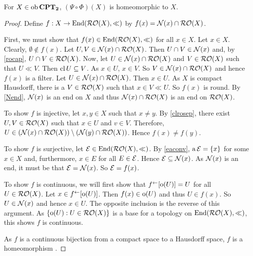 \begin{theorem}
	\label{psiphihomeom}
	For \( X \in \operatorname{ob}{\bf{CPT}_\mathbf{2}} \), \( (\Psi \circ \Phi)(X) \) is homeomorphic to \( X \).
\end{theorem}
\begin{proof}
	Define \( f:X \to \operatorname{End}(\operatorname{\mathcal{RO}}(X),\ll) \) by \( f(x) = \mathcal{N}(x) \cap \operatorname{\mathcal{RO}}(X) \).
	
	First, we must show that \( f(x) \in \operatorname{End}(\operatorname{\mathcal{RO}}(X),\ll) \) for all \( x \in X \).  Let \( x \in X \).  Clearly, \( \emptyset \not\in f(x) \).  Let \( U,V \in \mathcal{N}(x) \cap \operatorname{\mathcal{RO}}(X) \).  Then \( U \cap V \in \mathcal{N}(x) \) and, by \ref{rocap}, \( U \cap V \in \operatorname{\mathcal{RO}}(X) \).  Now, let \( U \in \mathcal{N}(x) \cap \operatorname{\mathcal{RO}}(X) \) and \( V \in \operatorname{\mathcal{RO}}(X) \) such that \( U \ll V \).  Then \( \operatorname{cl}{U} \subseteq V \).  As \( x \in U \), \( x \in V \).  So \( V \in \mathcal{N}(x) \cap \operatorname{\mathcal{RO}}(X) \) and hence \( f(x) \) is a filter.  Let \( U \in \mathcal{N}(x) \cap \operatorname{\mathcal{RO}}(X) \).  Then \( x \in U \).  As \( X \) is compact Hausdorff, there is a \( V \in \operatorname{\mathcal{RO}}(X) \) such that \( x \in V \ll U \).  So \( f(x) \) is round.  By \ref{Nend}, \( \mathcal{N}(x) \) is an end on \( X \) and thus \( \mathcal{N}(x) \cap \operatorname{\mathcal{RO}}(X) \) is an end on \( \operatorname{\mathcal{RO}}(X) \).
	
	To show \( f \) is injective, let \( x,y \in X \) such that \( x \neq y \).  By \ref{clrosep}, there exist \( U,V \in \operatorname{\mathcal{RO}}(X) \) such that \( x \in U \) and \( v \in V \).  Therefore, \( U \in (\mathcal{N}(x) \cap \operatorname{\mathcal{RO}}(X)) \setminus (\mathcal{N}(y) \cap \operatorname{\mathcal{RO}}(X)) \).  Hence \( f(x) \neq f(y) \).
	
	To show \( f \) is surjective, let \( \mathcal{E} \in \operatorname{End}(\operatorname{\mathcal{RO}}(X),\ll) \).  By \ref{eaconv}, \( \operatorname{a}\mathcal{E} = \{ x \} \) for some \( x \in X \) and, furthermore, \( x \in E \) for all \( E \in \mathcal{E} \).  Hence \( \mathcal{E} \subseteq \mathcal{N}(x) \).  As \( \mathcal{N}(x) \) is an end, it must be that \( \mathcal{E} = \mathcal{N}(x) \).  So \( \mathcal{E} = f(x) \).
	
	To show \( f \) is continuous, we will first show that \( f^\leftarrow[\operatorname{o}(U)] = U \) for all \( U \in \operatorname{\mathcal{RO}}(X) \).  Let \( x \in f^\leftarrow[\operatorname{o}(U)] \).  Then \( f(x) \in \operatorname{o}(U) \) and thus \( U \in f(x) \).  So \( U \in \mathcal{N}(x) \) and hence \( x \in U \).  The opposite inclusion is the reverse of this argument.  As \( \{ \operatorname{o}(U): U \in \operatorname{\mathcal{RO}}(X) \} \) is a base for a topology on \( \operatorname{End}(\operatorname{\mathcal{RO}}(X),\ll) \), this shows \( f \) is continuous.
	
	As \( f \) is a continuous bijection from a compact space to a Hausdorff space, \( f \) is a homeomorphism \cite{givant}.
\end{proof}

